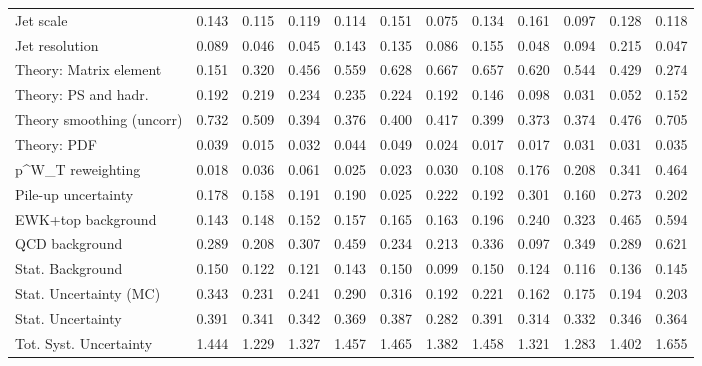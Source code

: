 \begin{tabular}{l|p{0.6cm}p{0.6cm}p{0.6cm}p{0.6cm}p{0.6cm}p{0.6cm}p{0.6cm}p{0.6cm}p{0.6cm}p{0.6cm}p{0.6cm}}
Jet scale                                & 0.143 & 0.115 & 0.119 & 0.114 & 0.151 & 0.075 & 0.134 & 0.161 & 0.097 & 0.128 & 0.118 \\
Jet resolution                           & 0.089 & 0.046 & 0.045 & 0.143 & 0.135 & 0.086 & 0.155 & 0.048 & 0.094 & 0.215 & 0.047 \\
Theory: Matrix element                   & 0.151 & 0.320 & 0.456 & 0.559 & 0.628 & 0.667 & 0.657 & 0.620 & 0.544 & 0.429 & 0.274 \\
Theory: PS and hadr.                     & 0.192 & 0.219 & 0.234 & 0.235 & 0.224 & 0.192 & 0.146 & 0.098 & 0.031 & 0.052 & 0.152 \\
Theory smoothing (uncorr)                & 0.732 & 0.509 & 0.394 & 0.376 & 0.400 & 0.417 & 0.399 & 0.373 & 0.374 & 0.476 & 0.705 \\
Theory: PDF                              & 0.039 & 0.015 & 0.032 & 0.044 & 0.049 & 0.024 & 0.017 & 0.017 & 0.031 & 0.031 & 0.035 \\
p^{W}_{T} reweighting                    & 0.018 & 0.036 & 0.061 & 0.025 & 0.023 & 0.030 & 0.108 & 0.176 & 0.208 & 0.341 & 0.464 \\
Pile-up uncertainty                      & 0.178 & 0.158 & 0.191 & 0.190 & 0.025 & 0.222 & 0.192 & 0.301 & 0.160 & 0.273 & 0.202 \\
EWK+top background                       & 0.143 & 0.148 & 0.152 & 0.157 & 0.165 & 0.163 & 0.196 & 0.240 & 0.323 & 0.465 & 0.594 \\
QCD background                           & 0.289 & 0.208 & 0.307 & 0.459 & 0.234 & 0.213 & 0.336 & 0.097 & 0.349 & 0.289 & 0.621 \\
Stat. Background                         & 0.150 & 0.122 & 0.121 & 0.143 & 0.150 & 0.099 & 0.150 & 0.124 & 0.116 & 0.136 & 0.145 \\
Stat. Uncertainty (MC)                   & 0.343 & 0.231 & 0.241 & 0.290 & 0.316 & 0.192 & 0.221 & 0.162 & 0.175 & 0.194 & 0.203 \\
\hline
Stat. Uncertainty                        & 0.391 & 0.341 & 0.342 & 0.369 & 0.387 & 0.282 & 0.391 & 0.314 & 0.332 & 0.346 & 0.364 \\
\hline
Tot. Syst. Uncertainty                   & 1.444 & 1.229 & 1.327 & 1.457 & 1.465 & 1.382 & 1.458 & 1.321 & 1.283 & 1.402 & 1.655 \\
\hline
\end{tabular}
